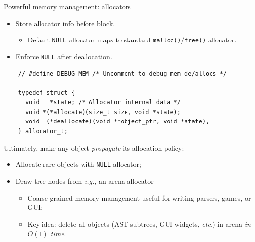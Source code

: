 \begin{frame}[fragile]{Powerful memory management: allocators}

  \begin{itemize}
  \item Store allocator info before block.
    \begin{itemize}
    \item Default \lstinline{NULL} allocator maps to standard \lstinline{malloc()}/\lstinline{free()} allocator.
    \end{itemize}
  \item Enforce \lstinline{NULL} after deallocation.
  \end{itemize}

  \begin{lstlisting}
    // #define DEBUG_MEM /* Uncomment to debug mem de/allocs */
    
    typedef struct {
      void   *state; /* Allocator internal data */
      void *(*allocate)(size_t size, void *state);
      void  (*deallocate)(void **object_ptr, void *state);
    } allocator_t;
  \end{lstlisting}

  Ultimately, make any object {\em propagate} its allocation policy:
  \begin{itemize}
  \item Allocate rare objects with \lstinline{NULL} allocator;
  \item Draw tree nodes from {\em e.g.}, an arena allocator
    \begin{itemize}
    \item Coarse-grained memory management useful for writing parsers, games, or GUI;
    \item Key idea: delete all objects (AST subtrees, GUI widgets, {\em etc.}) in arena {\em in $O(1)$ time}.
    \end{itemize}
  \end{itemize}
  
\end{frame}


